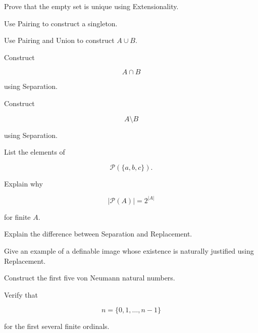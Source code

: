 \begin{exercise}[2]
Prove that the empty set is unique using Extensionality.
\end{exercise}

\begin{exercise}[2]
Use Pairing to construct a singleton.
\end{exercise}

\begin{exercise}[2]
Use Pairing and Union to construct \(A\cup B\).
\end{exercise}

\begin{exercise}[2]
Construct

\[
A\cap B
\]

using Separation.
\end{exercise}

\begin{exercise}[2]
Construct

\[
A\setminus B
\]

using Separation.
\end{exercise}

\begin{exercise}[2]
List the elements of

\[
\mathcal{P}(\{a,b,c\}).
\]
\end{exercise}

\begin{exercise}[2]
Explain why

\[
|\mathcal{P}(A)|=2^{|A|}
\]

for finite \(A\).
\end{exercise}

\begin{exercise}[3]
Explain the difference between Separation and Replacement.
\end{exercise}

\begin{exercise}[3]
Give an example of a definable image whose existence is naturally justified
using Replacement.
\end{exercise}

\begin{exercise}[2]
Construct the first five von Neumann natural numbers.
\end{exercise}

\begin{exercise}[2]
Verify that

\[
n=\{0,1,\ldots,n-1\}
\]

for the first several finite ordinals.
\end{exercise}

